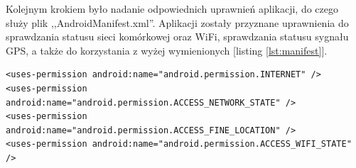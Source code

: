 \documentclass[eng,printmode,oneside]{mgr}
\begin{document}
Kolejnym krokiem było nadanie odpowiednich uprawnień aplikacji, do czego służy
plik ,,AndroidManifest.xml''. Aplikacji zostały przyznane uprawnienia do
sprawdzania statusu sieci komórkowej oraz WiFi, sprawdzania statusu sygnału
GPS, a także do korzystania z wyżej wymienionych [listing \ref{lst:manifest}].

\begin{lstlisting}[caption=Nadanie uprawnień aplikacji
Android w pliku AndroidManifest.xml,label=lst:manifest] 
<uses-permission android:name="android.permission.INTERNET" />
<uses-permission android:name="android.permission.ACCESS_NETWORK_STATE" />
<uses-permission android:name="android.permission.ACCESS_FINE_LOCATION" />
<uses-permission android:name="android.permission.ACCESS_WIFI_STATE" />
\end{lstlisting}
\end{document}
